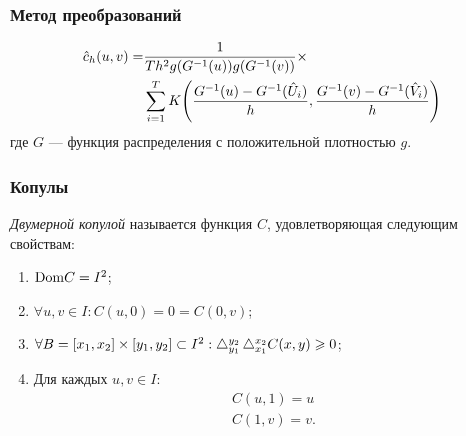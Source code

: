 \documentclass[11pt]{beamer}
\begin{document}
\begin{frame}
\frametitle{Метод преобразований}
\begin{align}
\hat{c}_h(u, v) = &\frac{1}{Th^2g(G^{-1}(u))g(G^{-1}(v))}\times \\
&\sum_{i=1}^T K\brts*{\frac{G^{-1}(u) - G^{-1}(\hat{U}_i)}{h},\frac{G^{-1}(v) - G^{-1}(\hat{V}_i)}{h}}
\end{align}
где $G$ --- функция распределения с положительной плотностью $g$.
\end{frame}

\begin{frame}
\frametitle{Копулы}
\emph{Двумерной копулой} называется функция $C$, удовлетворяющая следующим свойствам:
\begin{enumerate}
\item $\mathrm{Dom}{C} = I^2$;
\item $\forall u,v \in I : C(u, 0) = 0 = C(0, v)$;
\item $\forall B = [x_1, x_2] \times [y_1, y_2] \subset I^2 : \mathop{}\!\mathbin\bigtriangleup_{y_1}^{y_2}\mathop{}\!\mathbin\bigtriangleup_{x_1}^{x_2}C(x, y) \geqslant 0$;
\item Для каждых $u, v \in I$:
  \begin{gather}
    C(u, 1) = u \\
    C(1, v) = v.
  \end{gather}
\end{enumerate}
\end{frame}
\end{document}
